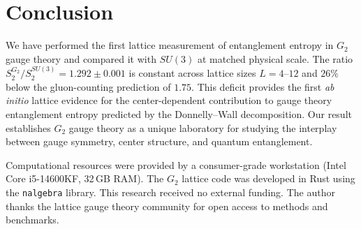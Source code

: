 \documentclass[twocolumn,prd,nofootinbib]{revtex4-2}
\begin{document}
\section{Conclusion}

We have performed the first lattice measurement of entanglement entropy in $G_2$ gauge theory and compared it with $SU(3)$ at matched physical scale. The ratio $S_2^{G_2}/S_2^{SU(3)} = 1.292 \pm 0.001$ is constant across lattice sizes $L = 4$--$12$ and $26\%$ below the gluon-counting prediction of $1.75$. This deficit provides the first \emph{ab initio} lattice evidence for the center-dependent contribution to gauge theory entanglement entropy predicted by the Donnelly--Wall decomposition. Our result establishes $G_2$ gauge theory as a unique laboratory for studying the interplay between gauge symmetry, center structure, and quantum entanglement.

\begin{acknowledgments}
Computational resources were provided by a consumer-grade workstation (Intel Core i5-14600KF, 32\,GB RAM). The $G_2$ lattice code was developed in Rust using the \texttt{nalgebra} library. This research received no external funding. The author thanks the lattice gauge theory community for open access to methods and benchmarks.
\end{acknowledgments}
\end{document}
